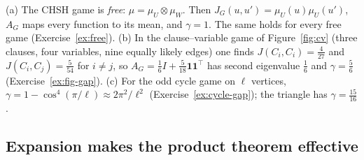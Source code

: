 \begin{example}\label{ex:gaps}
(a) The CHSH game is \emph{free}: $\mu=\mu_U\otimes\mu_W$.  Then $J_G(u,u')=\mu_U(u)\mu_U(u')$, $A_G$ maps every function to its mean, and $\gamma=1$.  The same holds for every free game (Exercise~\ref{ex:free}).
(b) In the clause--variable game of Figure~\ref{fig:cv} (three clauses, four variables, nine equally likely edges) one finds $J(C_i,C_i)=\frac4{27}$ and $J(C_i,C_j)=\frac5{54}$ for $i\ne j$, so $A_G=\frac16I+\frac5{18}\mathbf 1\mathbf 1^\top$ has second eigenvalue $\frac16$ and $\gamma=\frac56$ (Exercise~\ref{ex:fig-gap}).
(c) For the odd cycle game on $\ell$ vertices, $\gamma=1-\cos^4(\pi/\ell)\approx2\pi^2/\ell^2$ (Exercise~\ref{ex:cycle-gap}); the triangle has $\gamma=\frac{15}{16}$.
\end{example}

\subsection{Expansion makes the product theorem effective}

